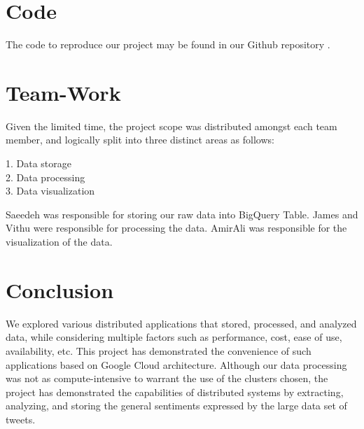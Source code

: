 \documentclass[a4paper,12pt]{article}
\begin{document}
\section{Code}
The code to reproduce our project may be found in our Github repository \cite{Githubrepository}.

\section{Team-Work}
Given the limited time, the project scope was distributed amongst each team member, and logically split into three distinct
areas as follows:

1. Data storage\\
2. Data processing\\
3. Data visualization

Saeedeh was responsible for storing our raw data into BigQuery Table.
James and Vithu were responsible for processing the data.
AmirAli was responsible for the visualization of the data.

\section{Conclusion}
We explored various distributed applications that stored, processed, and analyzed data, while considering multiple
factors such as performance, cost, ease of use, availability, etc. This project has demonstrated the convenience
of such applications based on Google Cloud architecture. Although our data processing was not as compute-intensive
to warrant the use of the clusters chosen, the project has demonstrated the capabilities of distributed systems by
extracting, analyzing, and storing the general sentiments expressed by the large data set of tweets.

\nocite{*}



\end{document}
